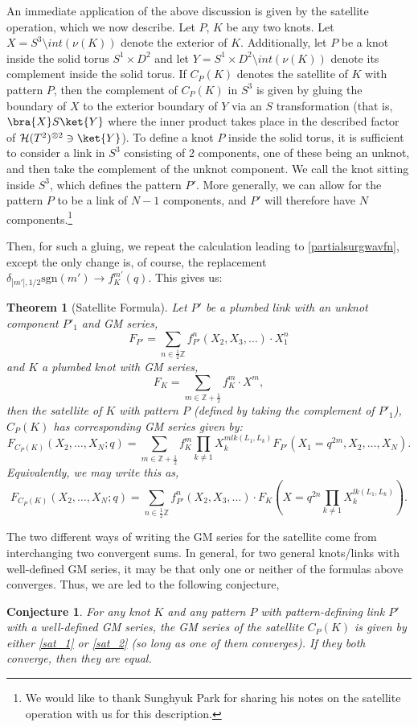 \documentclass{article}
\newcommand{\Z}{{\mathbb Z}}
\def\be{\begin{equation}}
\def\ee{\end{equation}}
\newtheorem{theorem}{Theorem}
\newtheorem{conjecture}{Conjecture}
\numberwithin{corollary}{theorem}
\numberwithin{corollary}{proposition}
\begin{document}
An immediate application of the above discussion is given by the satellite operation, which we now describe. Let $P$, $K$ be any two knots. Let $X = S^3 \setminus int(\nu(K))$ denote the exterior of $K$. Additionally, let $P$ be a knot inside the solid torus $S^1\times D^2$ and let $Y = S^1\times D^2 \setminus int(\nu(K)) $ denote its complement inside the solid torus. If $C_P(K)$ denotes the satellite of $K$ with pattern $P$, then the complement of $C_P(K)$ in $S^3$ is given by gluing the boundary of $X$ to the exterior boundary of $Y$ via an $S$ transformation (that is, $\bra{X}S\ket{Y}$ where the inner product takes place in the described factor of $\mathcal{H}(T^2)^{\otimes 2} \ni \ket{Y} $). To define a knot $P$ inside the solid torus, it is sufficient to consider a link in $S^3$ consisting of 2 components, one of these being an unknot, and then take the complement of the unknot component. We call the knot sitting inside $S^3$, which defines the pattern $P'$. More generally, we can allow for the pattern $P$ to be a link of $N-1$ components, and $P'$ will therefore have $N$ components.\footnote{We would like to thank Sunghyuk Park for sharing his notes on the satellite operation with us for this description.}

Then, for such a gluing, we repeat the calculation leading to \eqref{partialsurgwavfn}, except the only change is, of course, the replacement $\delta_{|m'|,1/2} \mathrm{sgn}(m') \rightarrow f^{m'}_K(q)$. This gives us:

\begin{theorem}[Satellite Formula]\label{satellite}
    Let $P'$ be a plumbed link with an unknot component $P'_1$ and GM series,
    $$F_{P'} = \sum_{n\in \frac{1}{2}\Z} f^n_{P'}(X_2,X_3,\ldots) \cdot X_1^n $$
    and $K$ a plumbed knot with GM series,
    $$F_K = \sum_{m\in \Z+\frac{1}{2}} f^m_{K} \cdot X^m,$$
    then the satellite of $K$ with pattern $P$ (defined by taking the complement of $P'_1$), $C_P(K)$ has corresponding GM series given by:
\be \label{sat_1} 
F_{C_P(K)}(X_2,\ldots,X_N;q) = \sum_{m\in \Z+\frac{1}{2}} f^{m}_K \prod_{k\neq 1} X^{m lk(L_1,L_k)}_k  F_{P'}(X_1 = q^{2m},X_2,\ldots,X_N).
\ee 
Equivalently, we may write this as, 
\be \label{sat_2}
F_{C_P(K)}(X_2,\ldots,X_N;q) = \sum_{n\in \frac{1}{2}\Z} f^n_{P'} (X_2,X_3,\ldots) \cdot F_K(X = q^{2n } \prod_{k\neq 1} X^{lk(L_1,L_k)}_k).
\ee     
\end{theorem}
The two different ways of writing the GM series for the satellite come from interchanging two convergent sums. In general, for two general knots/links with well-defined GM series, it may be that only one or neither of the formulas above converges. Thus, we are led to the following conjecture,
\begin{conjecture}
    For any knot $K$ and any pattern $P$ with pattern-defining link $P'$ with a well-defined GM series, the GM series of the satellite $C_{P}(K)$ is given by either \eqref{sat_1} or \eqref{sat_2} (so long as one of them converges). If they both converge, then they are equal.  
\end{conjecture} 
\end{document}
